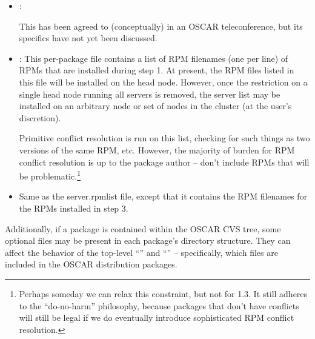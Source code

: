 \begin{itemize}
\item {}: 

  \begin{discuss}
    This has been agreed to (conceptually) in an OSCAR teleconference,
    but its specifics have not yet been discussed.
  \end{discuss}

\item {}: This per-package file contains a list of
  RPM filenames (one per line) of RPMs that are installed during step
  1.  At present, the RPM files listed in this file will be installed
  on the head node.  However, once the restriction on a single head
  node running all servers is removed, the server list may be
  installed on an arbitrary node or set of nodes in the cluster (at
  the user's discretion).
  
  Primitive conflict resolution is run on this list, checking for such
  things as two versions of the same RPM, etc.  However, the majority
  of burden for RPM conflict resolution is up to the package author --
  don't include RPMs that will be problematic.\footnote{ Perhaps
    someday we can relax this constraint, but not for 1.3.  It still
    adheres to the ``do-no-harm'' philosophy, because packages that
    don't have conflicts will still be legal if we do eventually
    introduce sophisticated RPM conflict resolution.}
  
\item {} Same as the server.rpmlist file, except
  that it contains the RPM filenames for the RPMs installed in step 3.
\end{itemize}

Additionally, if a package is contained within the OSCAR CVS tree,
some optional files may be present in each package's directory
structure.  They can affect the behavior of the top-level ``'' and ``'' -- specifically, which files
are included in the OSCAR distribution packages.

